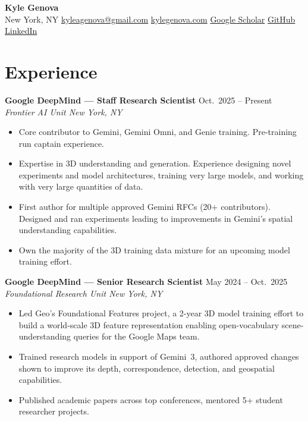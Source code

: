 \documentclass[10.5pt]{article}
\newcommand{\entryhead}[3]{\textbf{#1} \hfill {\color{muted}#2}\\ \textit{#3}}
\begin{document}
\begin{center}
  {\Huge\bfseries Kyle Genova}\\[5pt]
  {\color{muted} New York, NY \; \textbullet \;
  \href{mailto:kyleagenova@gmail.com}{kyleagenova@gmail.com} \; \textbullet \;
  \href{https://www.kylegenova.com}{kylegenova.com} \; \textbullet \;
  \href{https://scholar.google.com/citations?user=73HIeWcAAAAJ}{Google Scholar} \; \textbullet \;
  \href{https://github.com/kylegenova}{GitHub} \; \textbullet \;
  \href{https://www.linkedin.com/in/kylegenova/}{LinkedIn}}\\[6pt]
\end{center}

\vspace{-2pt}
\section{Experience}

\entryhead{Google DeepMind — Staff Research Scientist}{Oct.\ 2025 -- Present}{Frontier AI Unit \hfill New York, NY}
\begin{itemize}
  \item Core contributor to Gemini, Gemini Omni, and Genie training. Pre-training run captain experience.
  \item Expertise in 3D understanding and generation. Experience designing novel experiments and model architectures, training very large models, and working with very large quantities of data. 
  \item First author for multiple approved Gemini RFCs (20+ contributors). Designed and ran experiments leading to improvements in Gemini's spatial understanding capabilities.
  \item Own the majority of the 3D training data mixture for an upcoming model training effort.
\end{itemize}

\entryhead{Google DeepMind — Senior Research Scientist}{May 2024 -- Oct.\ 2025}{Foundational Research Unit \hfill New York, NY}
\begin{itemize}
  \item Led Geo's Foundational Features project, a 2-year 3D model training effort to build a world-scale 3D feature representation enabling open-vocabulary scene-understanding queries for the Google Maps team.
  \item Trained research models in support of Gemini~3, authored approved changes shown to improve its depth, correspondence, detection, and geospatial capabilities.
  \item Published academic papers across top conferences, mentored 5+ student researcher projects.
\end{itemize}
\end{document}
